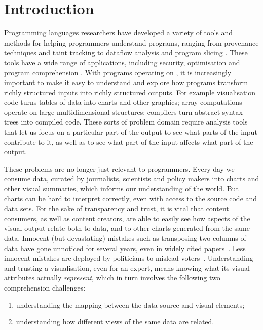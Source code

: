 \section{Introduction}

Programming languages researchers have developed a variety of tools and methods for helping programmers understand programs, ranging from provenance techniques and taint tracking to dataflow analysis and program slicing . These tools have a wide range of applications, including security, optimisation and program comprehension . With programs operating on , it is increasingly important to make it easy to understand and explore how programs transform richly structured inputs into richly structured outputs. For example visualisation code turns tables of data into charts and other graphics; array computations operate on large multidimensional structures; compilers turn abstract syntax trees into compiled code. These sorts of problem domain require analysis tools that let us focus on a particular part of the output to see what parts of the input contribute to it, as well as to see what part of the input affects what part of the output. 

These problems are no longer just relevant to programmers. Every day we consume data, curated by journalists, scientists and policy makers into charts and other visual summaries, which informs our understanding of the world. But charts can be hard to interpret correctly, even with access to the source code and data sets. For the sake of transparency and trust, it is vital that content consumers, as well as content creators, are able to easily see how aspects of the visual output relate both to data, and to other charts generated from the same data. Innocent (but devastating) mistakes such as transposing two columns of data have gone unnoticed for several years, even in widely cited papers~\cite{miller06}. Less innocent mistakes are deployed by politicians to mislead voters~\cite{fullfact19}. Understanding and trusting a visualisation, even for an expert, means knowing what its visual attributes actually \emph{represent}, which in turn involves the following two comprehension challenges:

\begin{enumerate}
  \item understanding the mapping between the data source and visual elements;
  \item understanding how different views of the same data are related.
\end{enumerate}

